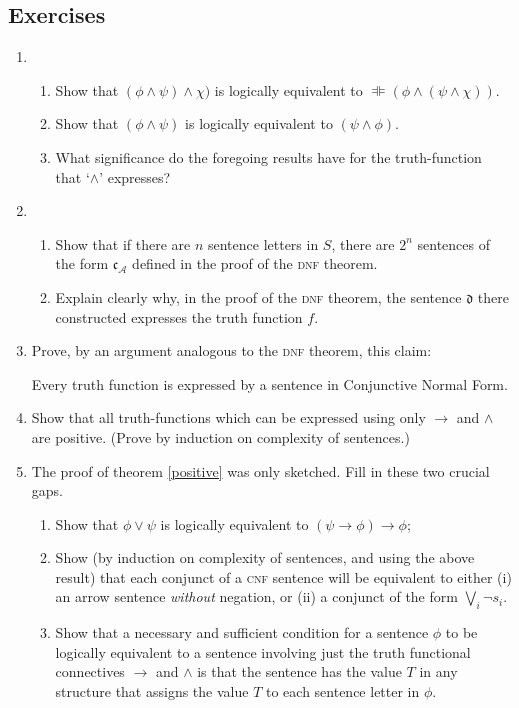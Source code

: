 {\small

\subsection*{Exercises} \label{ex5}

\begin{enumerate}
\item \begin{enumerate}
	\item Show that $(\phi\wedge \psi)\wedge \chi)$ is logically equivalent to $\DashVDash (\phi\wedge(\psi\wedge \chi))$.
	\item Show that $(\phi\wedge \psi)$ is logically equivalent to $(\psi \wedge \phi)$.
	\item What significance do the foregoing results have for the truth-function that `$\wedge$' expresses?  
\end{enumerate}

\item \begin{enumerate}
	
	\item Show that if there are $n$ sentence letters in $S$, there are $2^{n}$ sentences of the form $\mathfrak{c}_{\mathscr{A}}$ defined in the proof of the \textsc{\lowercase{DNF}} theorem.
\item Explain clearly why, in the proof of the \textsc{\lowercase{DNF}} theorem, the sentence $\mathfrak{d}$ there constructed expresses the truth function $f$.
\end{enumerate}
\item  Prove, by an argument analogous to the \textsc{\lowercase{DNF}} theorem, this claim: \begin{theorem} 	Every truth function is expressed by a sentence in Conjunctive Normal Form.\end{theorem}
\item Show that  all truth-functions which can be expressed using only $\to$ and $\wedge$ are positive. (Prove by induction on complexity of sentences.)

\item The proof of theorem \ref{positive} was only sketched. Fill in these two crucial gaps.\begin{enumerate} 
	\item Show that $\phi\vee \psi$ is logically equivalent to $(\psi \to \phi)\to \phi$;
	\item Show (by induction on complexity of sentences, and using the above result) that each conjunct of a \textsc{\lowercase{CNF}} sentence will be equivalent to either (i) an arrow sentence \emph{without} negation, or (ii)  a conjunct  of the form $\bigvee_{i} \neg s_{i}$.
		\item	 Show that a necessary and sufficient condition for a sentence $\phi$ to be logically equivalent to a sentence involving just the truth functional connectives $\to$ and $\wedge$ is that the sentence has the value $T$ in any structure that assigns the value $T$ to each sentence letter in $\phi$. \end{enumerate}


\end{enumerate}}
